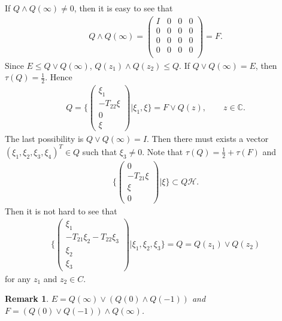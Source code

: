 \documentclass[a4paper,10pt]{amsart}
\newtheorem{remark}{Remark}[section]
\newcommand{\HHH}{\mathcal H} %
\newcommand{\C}{\mathbb C} %
\begin{document}
If $Q \wedge Q(\infty) \neq 0$, then it is easy to see that
\begin{align*}
    Q \wedge Q(\infty) = 
    \begin{pmatrix}
        I & 0 & 0 & 0\\
        0 & 0 & 0 & 0 \\
        0 & 0 & 0 & 0 \\
        0 & 0 & 0 & 0 \\
    \end{pmatrix} = F.
\end{align*}
Since $E \leq Q \vee Q(\infty)$, $Q(z_1) \wedge Q(z_2) \leq Q$.
If $Q \vee Q(\infty) = E$, then $\tau(Q) = \frac{1}{2}$. Hence
\begin{align*}
    Q =
    \{ \begin{pmatrix}
            \xi_1\\
            -T_{22}\xi\\
            0\\
            \xi
    \end{pmatrix} | \xi_1, \xi \} = F \vee Q(z), \qquad z \in \C. 
\end{align*}
The last possibility is $Q \vee Q(\infty) = I$. Then there must 
exists a vector $(\xi_1, \xi_2, \xi_3, \xi_4)^{T} \in Q$ such that
$\xi_3 \neq 0$. Note that $\tau(Q) = \frac{1}{2} + \tau(F)$ and
\begin{align*}
    \{ \begin{pmatrix}
             0\\
            -T_{21}\xi\\
            \xi\\
            0 
    \end{pmatrix} | \xi \} \subset Q\HHH.
\end{align*}
Then it is not hard to see that
\begin{align*}
    \{ \begin{pmatrix}
             \xi_1 \\
             -T_{21}\xi_{2} - T_{22}\xi_3\\
             \xi_{2}\\
             \xi_{3} 
     \end{pmatrix} | \xi_1, \xi_2, \xi_3 \} = Q = Q(z_1)\vee Q(z_2)   
\end{align*}
for any $z_1$ and $z_2 \in C$.

\begin{remark}
    $E = Q(\infty) \vee (Q(0) \wedge Q(-1))$ and 
    $F = (Q(0) \vee Q(-1)) \wedge Q(\infty)$.  
\end{remark}
\end{document}
